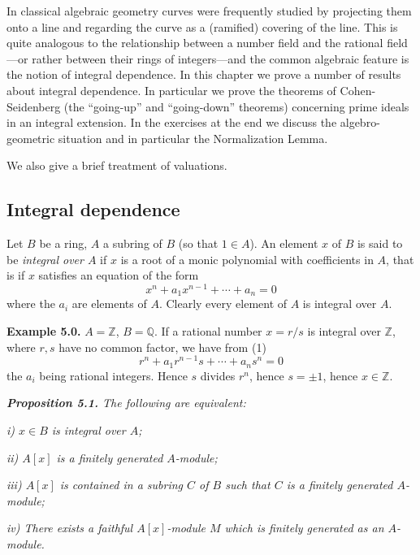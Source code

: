 In classical algebraic geometry curves were frequently studied by projecting
them onto a line and regarding the curve as a (ramified) covering of the line.
This is quite analogous to the relationship between a number field and the
rational field---or rather between their rings of integers---and the common
algebraic feature is the notion of integral dependence.  In this chapter we prove a
number of results about integral dependence.  In particular we prove the theorems of Cohen-Seidenberg (the ``going-up'' and ``going-down'' theorems)
concerning prime ideals in an integral extension.  In the exercises at the end we
discuss the algebro-geometric situation and in particular the Normalization
Lemma.

We also give a brief treatment of valuations.

\subsection{Integral dependence}

Let $B$ be a ring, $A$ a subring of $B$ (so that $1\in A$).  An element $x$ of $B$ is said to
be \emph{integral over $A$} if $x$ is a root of a monic polynomial with coefficients in $A$, that
is if $x$ satisfies an equation of the form
\begin{equation}
x^n+a_1x^{n-1}+\cdots+a_n=0
\tag{1}
\end{equation}
where the $a_i$ are elements of $A$.  Clearly every element of $A$ is integral over $A$.

\medskip
\noindent\textbf{Example 5.0.} $A=\mathbb Z$, $B=\mathbb Q$.  If a rational number $x=r/s$ is integral over $\mathbb Z$,
where $r,s$ have no common factor, we have from (1)
\[
r^n+a_1r^{n-1}s+\cdots+a_ns^n=0
\]
the $a_i$ being rational integers.  Hence $s$ divides $r^n$, hence $s=\pm1$, hence $x\in\mathbb Z$.

\medskip
\noindent\textit{\textbf{Proposition 5.1.} The following are equivalent:}

\noindent\textit{i) $x\in B$ is integral over $A$;}

\noindent\textit{ii) $A[x]$ is a finitely generated $A$-module;}

\noindent\textit{iii) $A[x]$ is contained in a subring $C$ of $B$ such that $C$ is a finitely generated
$A$-module;}

\noindent\textit{iv) There exists a faithful $A[x]$-module $M$ which is finitely generated as an
$A$-module.}

